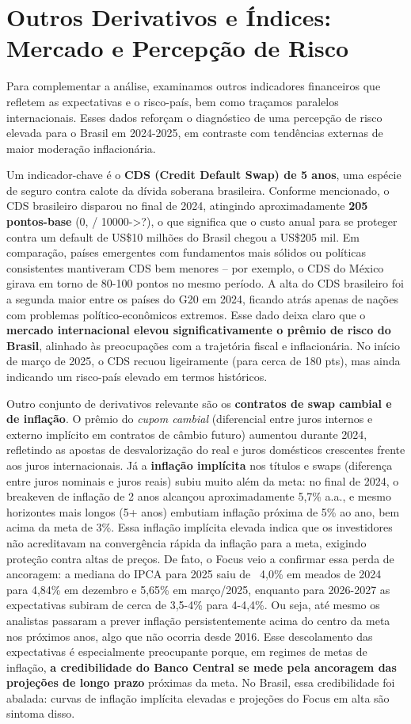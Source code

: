 \documentclass[a4paper,12pt]{article}
\begin{document}
\section{Outros Derivativos e Índices: Mercado e Percepção de Risco}

Para complementar a análise, examinamos outros indicadores financeiros que refletem as expectativas e o risco-país, bem como traçamos paralelos internacionais. Esses dados reforçam o diagnóstico de uma percepção de risco elevada para o Brasil em 2024-2025, em contraste com tendências externas de maior moderação inflacionária.

Um indicador-chave é o \textbf{CDS (Credit Default Swap) de 5 anos}, uma espécie de seguro contra calote da dívida soberana brasileira. Conforme mencionado, o CDS brasileiro disparou no final de 2024, atingindo aproximadamente \textbf{205 pontos-base} (0, / 10000->?), o que significa que o custo anual para se proteger contra um default de US\$10 milhões do Brasil chegou a US\$205 mil. Em comparação, países emergentes com fundamentos mais sólidos ou políticas consistentes mantiveram CDS bem menores -- por exemplo, o CDS do México girava em torno de 80-100 pontos no mesmo período. A alta do CDS brasileiro foi a segunda maior entre os países do G20 em 2024, ficando atrás apenas de nações com problemas político-econômicos extremos. Esse dado deixa claro que o \textbf{mercado internacional elevou significativamente o prêmio de risco do Brasil}, alinhado às preocupações com a trajetória fiscal e inflacionária. No início de março de 2025, o CDS recuou ligeiramente (para cerca de 180 pts), mas ainda indicando um risco-país elevado em termos históricos.

Outro conjunto de derivativos relevante são os \textbf{contratos de swap cambial e de inflação}. O prêmio do \textit{cupom cambial} (diferencial entre juros internos e externo implícito em contratos de câmbio futuro) aumentou durante 2024, refletindo as apostas de desvalorização do real e juros domésticos crescentes frente aos juros internacionais. Já a \textbf{inflação implícita} nos títulos e swaps (diferença entre juros nominais e juros reais) subiu muito além da meta: no final de 2024, o breakeven de inflação de 2 anos alcançou aproximadamente 5,7\% a.a., e mesmo horizontes mais longos (5+ anos) embutiam inflação próxima de 5\% ao ano, bem acima da meta de 3\%. Essa inflação implícita elevada indica que os investidores não acreditavam na convergência rápida da inflação para a meta, exigindo proteção contra altas de preços. De fato, o Focus veio a confirmar essa perda de ancoragem: a mediana do IPCA para 2025 saiu de ~4,0\% em meados de 2024 para 4,84\% em dezembro e 5,65\% em março/2025, enquanto para 2026-2027 as expectativas subiram de cerca de 3,5-4\% para 4-4,4\%. Ou seja, até mesmo os analistas passaram a prever inflação persistentemente acima do centro da meta nos próximos anos, algo que não ocorria desde 2016. Esse descolamento das expectativas é especialmente preocupante porque, em regimes de metas de inflação, \textbf{a credibilidade do Banco Central se mede pela ancoragem das projeções de longo prazo} próximas da meta. No Brasil, essa credibilidade foi abalada: curvas de inflação implícita elevadas e projeções do Focus em alta são sintoma disso.
\end{document}
